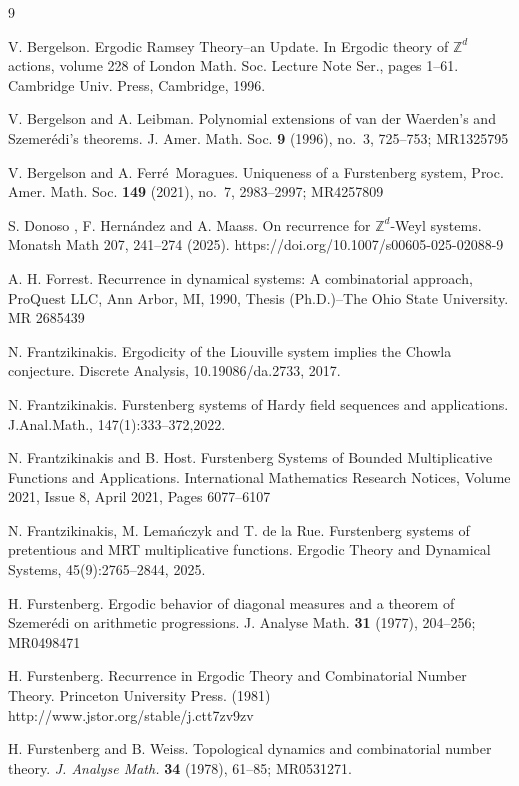 \documentclass{amsart}
\numberwithin{equation}{section}
\theoremstyle{definition}
\theoremstyle{plain}
\newcommand{\Z}{{\mathbb Z}}
\begin{document}
\begin{thebibliography}{9}


V. Bergelson. Ergodic Ramsey Theory–an Update. In Ergodic theory of $\Z^d$ actions, volume 228 of London Math. Soc.
Lecture Note Ser., pages 1–61. Cambridge Univ. Press, Cambridge, 1996.

 V. Bergelson and A. Leibman. Polynomial extensions of van der Waerden's and Szemer\'edi's theorems. J. Amer. Math. Soc. {\bf 9} (1996), no.~3, 725--753; MR1325795

 V. Bergelson and A. Ferr\'e~Moragues. Uniqueness of a Furstenberg system, Proc. Amer. Math. Soc. {\bf 149} (2021), no.~7, 2983--2997; MR4257809

S. Donoso , F. Hernández and A. Maass. On recurrence for 
$\Z^d$-Weyl systems. Monatsh Math 207, 241–274 (2025). https://doi.org/10.1007/s00605-025-02088-9

A. H. Forrest. Recurrence in dynamical systems: A combinatorial approach, ProQuest LLC, Ann
Arbor, MI, 1990, Thesis (Ph.D.)–The Ohio State University. MR 2685439

 N. Frantzikinakis. Ergodicity of the {Liouville} system implies the {Chowla} conjecture.
Discrete Analysis, 10.19086/da.2733, 2017.
	
N. Frantzikinakis. Furstenberg systems of Hardy field  sequences and applications. J.Anal.Math.,
147(1):333–372,2022.

 N. Frantzikinakis and B. Host. Furstenberg Systems of Bounded Multiplicative Functions and Applications. International Mathematics Research Notices, Volume 2021, Issue 8, April 2021, Pages 6077–6107

N. Frantzikinakis, M. Lemańczyk and T. de la Rue. Furstenberg systems of pretentious and MRT multiplicative functions. Ergodic Theory and Dynamical Systems, 45(9):2765–2844, 2025.

 H. Furstenberg. Ergodic behavior of diagonal measures and a theorem of Szemer\'edi on arithmetic progressions. J. Analyse Math. {\bf 31} (1977), 204--256; MR0498471

H. Furstenberg. Recurrence in Ergodic Theory and Combinatorial Number Theory. Princeton University Press. (1981) http://www.jstor.org/stable/j.ctt7zv9zv

H. Furstenberg and B. Weiss. Topological dynamics and combinatorial number theory. \textit{J. Analyse Math.} \textbf{34} (1978), 61--85; MR0531271.


\end{thebibliography}
\end{document}
